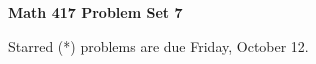 \documentclass[12pt]{article}
\begin{document}
\def\ctln{\centerline}
\def\msk{\medskip}
\def\bsk{\bigskip}
\def\ssk{\smallskip}
\def\hsk{\hskip.3in}
\def\ra{\rightarrow}
\def\ubr{\underbar}

\def\mt{{\mathcal T}}
\def\mb{{\mathcal B}}
\def\ms{{\mathcal S}}
\def\mu{{\mathcal U}}
\def\mv{{\mathcal V}}

\def\bbr{{\mathbb R}}
\def\bbz{{\mathbb Z}}
\def\spc{$~$\hskip.15in$~$}

\def\sset{\subseteq}
\def\del{\partial}
\def\lra{$\Leftrightarrow$}
\def\bra{$\Rightarrow$}




\ctln{\bf Math 417 Problem Set 7}

\msk

Starred (*) problems are due Friday, October 12.
\end{document}
